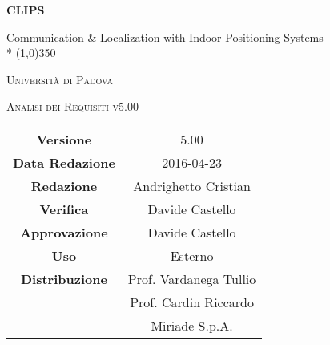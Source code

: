 \documentclass[a4paper,12pt]{article}
\author{Oscar Elia Conti, Marco Zanella}
\date{9/12/2015}
\begin{document}
	\begin{titlepage}
		\centering
		{\huge\bfseries CLIPS\par}
	Communication \& Localization with Indoor Positioning Systems \\*
	\line(1,0){350} \\
	{\scshape\LARGE Università di Padova \par}
	\vspace{1cm}
	{\scshape\Large Analisi dei Requisiti v5.00\par}
	\logo
	\newpage
		\begin{tabular}{c|c}
			{\hfill \textbf{Versione}} 		& 5.00				\\
			{\hfill\textbf{Data Redazione}} 	& 2016-04-23	  		\\
			{\hfill\textbf{Redazione}}		& Andrighetto Cristian 		\\
			{\hfill\textbf{Verifica}} 		& Davide Castello		\\
			{\hfill\textbf{Approvazione}} 		& Davide Castello		\\
			{\hfill\textbf{Uso}} 			& Esterno			\\
			{\hfill\textbf{Distribuzione}} 		& Prof. Vardanega Tullio 	\\
								& Prof. Cardin Riccardo 	\\
								& Miriade S.p.A. 		\\
		\end{tabular}
	\end{titlepage}
	\newpage
		\pagestyle{myfront}
		

	\newpage
		\tableofcontents
	\newpage
		\listoftables
	\newpage
		\listoffigures
	\label{LastFrontPage}

	\newpage
	\pagestyle{mymain}
		
	\newpage
		
	\newpage
		
	\newpage
		
	\newpage
		
	\label{LastPage}
\end{document}
